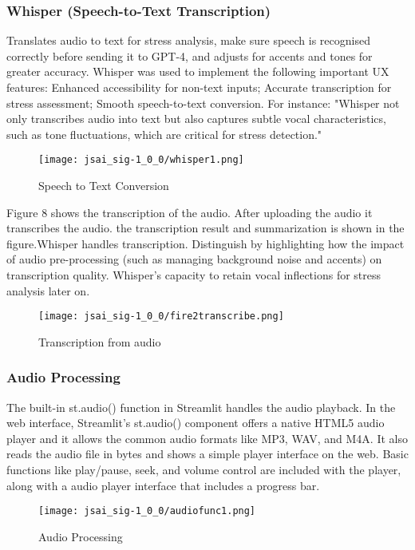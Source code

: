 \documentclass[a4j, twocolumn]{article}
\begin{document}
        \subsubsection{Whisper (Speech-to-Text Transcription)}
Translates audio to text for stress analysis, make sure speech is recognised correctly before sending it to GPT-4, and adjusts for accents and tones for greater accuracy. Whisper was used to implement the following important UX features: Enhanced accessibility for non-text inputs;  Accurate transcription for stress assessment; Smooth speech-to-text conversion. 
 For instance: "Whisper not only transcribes audio into text but also captures subtle vocal characteristics, such as tone fluctuations, which are critical for stress detection."
\setlength{\parskip}{0pt} %
\begin{figure}[htbp] %
\centering
\texttt{[image: jsai\_sig-1\_0\_0/whisper1.png]} %
\caption{Speech to Text Conversion}
\label{fig:system_architecture}
\end{figure}
\setlength{\parskip}{1em} %
\vspace{10pt} %
Figure 8 shows the transcription of the audio. After uploading the audio it transcribes the audio. the transcription result and summarization is shown in the figure.Whisper handles transcription. Distinguish by highlighting  how the impact of audio pre-processing (such as managing background noise and accents) on transcription quality. Whisper's capacity to retain vocal inflections for stress analysis later on.
\begin{figure}[H]
    \centering
    \texttt{[image: jsai\_sig-1\_0\_0/fire2transcribe.png]}
    \caption{Transcription from audio}
    \label{fig:system_architecture}
\end{figure}
\vspace{10pt} %
\subsubsection{Audio Processing}
The built-in st.audio() function in Streamlit handles the audio playback. In the web interface, Streamlit's st.audio() component offers a native HTML5 audio player and it allows the common audio formats like MP3, WAV, and M4A. It also reads the audio file in bytes and shows a simple player interface on the web. Basic functions like play/pause, seek, and volume control are included with the player, along with a audio player interface that includes a progress bar.
\vspace{10pt} %
\begin{figure}[H]
    \centering
    \texttt{[image: jsai\_sig-1\_0\_0/audiofunc1.png]}
    \caption{Audio Processing}
    \label{fig:system_architecture}
\end{figure}
\vspace{10pt} %
\end{document}
